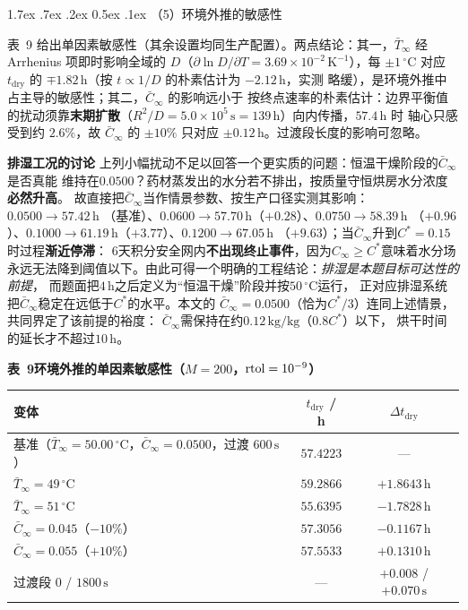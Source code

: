 \documentclass[withoutpreface,bwprint]{cumcmthesis} %
\makeatletter
\renewcommand\paragraph{\@startsection{paragraph}{4}{\z@}%
  {1.7ex \@plus .7ex \@minus .2ex}%
  {0.5ex \@plus .1ex}%
  {\normalfont\normalsize\bfseries}}
\makeatother
\begin{document}
\paragraph{（5）环境外推的敏感性}

表~9 给出单因素敏感性（其余设置均同生产配置）。两点结论：其一，$\bar T_\infty$
经 Arrhenius 项即时影响全域的 $D$（$\partial\ln D/\partial T=3.69\times10^{-2}\,
\mathrm{K^{-1}}$），每 $\pm1\,^\circ\mathrm{C}$ 对应 $t_{\mathrm{dry}}$ 的
$\mp1.82\,\mathrm{h}$（按 $t\propto1/D$ 的朴素估计为 $-2.12\,\mathrm{h}$，实测
略缓），是环境外推中占主导的敏感性；其二，$\bar C_\infty$ 的影响远小于
按终点速率的朴素估计：边界平衡值的扰动须靠\textbf{末期扩散}（$R^2/D=
5.0\times10^{5}\,\mathrm{s}=139\,\mathrm{h}$）向内传播，$57.4\,\mathrm{h}$ 时
轴心只感受到约 $2.6\%$，故 $\bar C_\infty$ 的 $\pm10\%$ 只对应
$\pm0.12\,\mathrm{h}$。过渡段长度的影响可忽略。

\noindent\textbf{排湿工况的讨论}
上列小幅扰动不足以回答一个更实质的问题：恒温干燥阶段的$\bar C_\infty$是否真能
维持在$0.0500$？药材蒸发出的水分若不排出，按质量守恒烘房水分浓度\textbf{必然升高}。
故直接把$\bar C_\infty$当作情景参数、按生产口径实测其影响：$0.0500\to57.42\,\mathrm{h}$
（基准）、$0.0600\to57.70\,\mathrm{h}$（$+0.28$）、$0.0750\to58.39\,\mathrm{h}$
（$+0.96$）、$0.1000\to61.19\,\mathrm{h}$（$+3.77$）、$0.1200\to67.05\,\mathrm{h}$
（$+9.63$）；当$\bar C_\infty$升到$C^{*}=0.15$时过程\textbf{渐近停滞}：
$6$天积分安全网内\textbf{不出现终止事件}，因为$C_\infty\ge C^{*}$意味着水分场
永远无法降到阈值以下。由此可得一个明确的工程结论：\emph{排湿是本题目标可达性的前提}，
而题面把$4\,\mathrm{h}$之后定义为``恒温干燥''阶段并按$50\,^\circ\mathrm{C}$运行，
正对应排湿系统把$\bar C_\infty$稳定在远低于$C^{*}$的水平。本文的
$\bar C_\infty=0.0500$（恰为$C^{*}/3$）连同上述情景，共同界定了该前提的裕度：
$\bar C_\infty$需保持在约$0.12\,\mathrm{kg/kg}$（$0.8C^{*}$）以下，
烘干时间的延长才不超过$10\,\mathrm{h}$。

\begin{table}[htbp]
\centering
\begin{minipage}{0.94\textwidth}
\centering\small
\textbf{表~9\quad 环境外推的单因素敏感性（$M=200$，${\rm rtol}=10^{-9}$）}\\[3pt]
\begin{tabular}{lcc}
\toprule
变体 & $t_{\mathrm{dry}}$ / h & $\Delta t_{\mathrm{dry}}$ \\
\midrule
基准（$\bar T_\infty=50.00\,^\circ\mathrm{C}$，$\bar C_\infty=0.0500$，过渡 $600\,\mathrm{s}$）
 & $57.4223$ & — \\
$\bar T_\infty=49\,^\circ\mathrm{C}$ & $59.2866$ & $+1.8643\,\mathrm{h}$ \\
$\bar T_\infty=51\,^\circ\mathrm{C}$ & $55.6395$ & $-1.7828\,\mathrm{h}$ \\
$\bar C_\infty=0.045$（$-10\%$） & $57.3056$ & $-0.1167\,\mathrm{h}$ \\
$\bar C_\infty=0.055$（$+10\%$） & $57.5533$ & $+0.1310\,\mathrm{h}$ \\
过渡段 $0$ / $1800\,\mathrm{s}$ & — & $+0.008$ / $+0.070\,\mathrm{s}$ \\
\bottomrule
\end{tabular}
\end{minipage}
\end{table}
\end{document}
